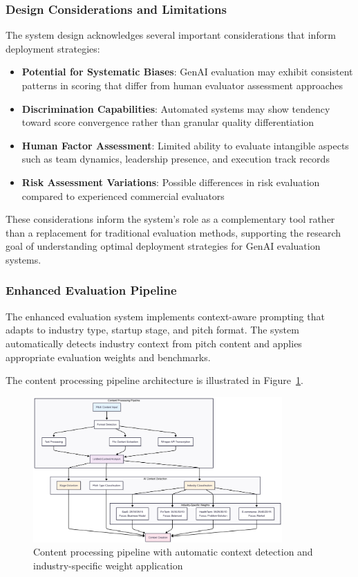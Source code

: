 \subsubsection{Design Considerations and Limitations}
The system design acknowledges several important considerations that inform deployment strategies:

\begin{itemize}
  \item \textbf{Potential for Systematic Biases}: GenAI evaluation may exhibit consistent patterns in scoring that differ from human evaluator assessment approaches
  \item \textbf{Discrimination Capabilities}: Automated systems may show tendency toward score convergence rather than granular quality differentiation
  \item \textbf{Human Factor Assessment}: Limited ability to evaluate intangible aspects such as team dynamics, leadership presence, and execution track records
  \item \textbf{Risk Assessment Variations}: Possible differences in risk evaluation compared to experienced commercial evaluators
\end{itemize}

These considerations inform the system's role as a complementary tool rather than a replacement for traditional evaluation methods, supporting the research goal of understanding optimal deployment strategies for GenAI evaluation systems.

\subsubsection{Enhanced Evaluation Pipeline}
The enhanced evaluation system implements context-aware prompting that adapts to industry type, startup stage, and pitch format. The system automatically detects industry context from pitch content and applies appropriate evaluation weights and benchmarks.

The content processing pipeline architecture is illustrated in Figure~\ref{fig:eval-flow-context}.

\begin{figure}[H]
  \centering
  \includegraphics[width=0.85\textwidth]{img/eval-flow-context}
  \caption{Content processing pipeline with automatic context detection and industry-specific weight application}
  \label{fig:eval-flow-context}
\end{figure}


